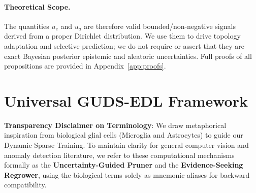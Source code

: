 \documentclass[letterpaper]{article} %
\begin{document}
\paragraph{Theoretical Scope.}
The quantities $u_e$ and $u_a$ are therefore valid bounded/non-negative signals derived from a proper Dirichlet distribution. We use them to drive topology adaptation and selective prediction; we do not require or assert that they are exact Bayesian posterior epistemic and aleatoric uncertainties. Full proofs of all propositions are provided in Appendix~\ref{app:proofs}.


\section{Universal GUDS-EDL Framework}\label{sec:methodology}

\textbf{Transparency Disclaimer on Terminology}: We draw metaphorical inspiration from biological glial cells (Microglia and Astrocytes) to guide our Dynamic Sparse Training. To maintain clarity for general computer vision and anomaly detection literature, we refer to these computational mechanisms formally as the \textbf{Uncertainty-Guided Pruner} and the \textbf{Evidence-Seeking Regrower}, using the biological terms solely as mnemonic aliases for backward compatibility.
\end{document}

